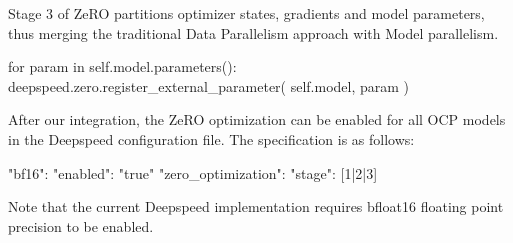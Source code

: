 Stage 3 of ZeRO partitions optimizer states, gradients and model parameters, thus merging the 
traditional Data Parallelism approach with Model parallelism.

\begin{python}
for param in self.model.parameters():
    deepspeed.zero.register_external_parameter(
        self.model, param
    )
\end{python}

After our integration, the ZeRO optimization can be enabled for all OCP models in the Deepspeed configuration 
file. The specification is as follows:

\begin{json}
"bf16": {
    "enabled": "true"
}
"zero_optimization": {
    "stage": [1|2|3]
}
\end{json}

Note that the current Deepspeed implementation requires bfloat16 floating point precision to be enabled. 
